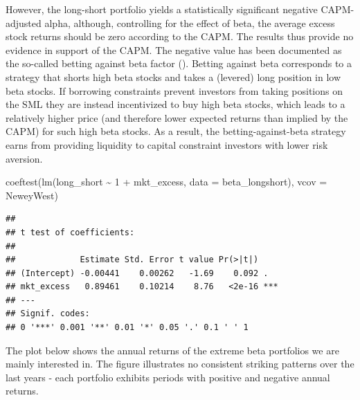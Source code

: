 \documentclass[
]{krantz}
\newenvironment{Shaded}{\begin{snugshade}}{\end{snugshade}}
\newcommand{\AttributeTok}[1]{\textcolor[rgb]{0.61,0.61,0.61}{#1}}
\newcommand{\DecValTok}[1]{\textcolor[rgb]{0.06,0.06,0.06}{#1}}
\newcommand{\FunctionTok}[1]{\textcolor[rgb]{0,0,0}{#1}}
\newcommand{\NormalTok}[1]{#1}
\newcommand{\SpecialCharTok}[1]{\textcolor[rgb]{0,0,0}{#1}}
\begin{document}
However, the long-short portfolio yields a statistically significant negative CAPM-adjusted alpha, although, controlling for the effect of beta, the average excess stock returns should be zero according to the CAPM. The results thus provide no evidence in support of the CAPM. The negative value has been documented as the so-called betting against beta factor (\citet{Frazzini2014}). Betting against beta corresponds to a strategy that shorts high beta stocks and takes a (levered) long position in low beta stocks. If borrowing constraints prevent investors from taking positions on the SML they are instead incentivized to buy high beta stocks, which leads to a relatively higher price (and therefore lower expected returns than implied by the CAPM) for such high beta stocks. As a result, the betting-against-beta strategy earns from providing liquidity to capital constraint investors with lower risk aversion.

\begin{Shaded}
\begin{Highlighting}[]
\FunctionTok{coeftest}\NormalTok{(}\FunctionTok{lm}\NormalTok{(long\_short }\SpecialCharTok{\textasciitilde{}} \DecValTok{1} \SpecialCharTok{+}\NormalTok{ mkt\_excess, }\AttributeTok{data =}\NormalTok{ beta\_longshort), }\AttributeTok{vcov =}\NormalTok{ NeweyWest)}
\end{Highlighting}
\end{Shaded}

\begin{verbatim}
## 
## t test of coefficients:
## 
##             Estimate Std. Error t value Pr(>|t|)    
## (Intercept) -0.00441    0.00262   -1.69    0.092 .  
## mkt_excess   0.89461    0.10214    8.76   <2e-16 ***
## ---
## Signif. codes:  
## 0 '***' 0.001 '**' 0.01 '*' 0.05 '.' 0.1 ' ' 1
\end{verbatim}

The plot below shows the annual returns of the extreme beta portfolios we are mainly interested in. The figure illustrates no consistent striking patterns over the last years - each portfolio exhibits periods with positive and negative annual returns.
\end{document}
